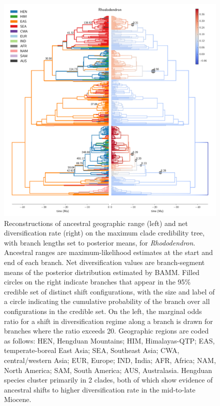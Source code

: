 \documentclass[12pt]{article}
\begin{document}
\begin{figure}
\begin{center}
\includegraphics[width=.99\textwidth]{figures/Rhododendron-supfig/Rhododendron-supfig.pdf}
\end{center}
\caption{Reconstructions of ancestral geographic range (left) and net diversification rate (right) on the maximum clade credibility tree, with branch lengths set to posterior means, for \textit{Rhododendron}. Ancestral ranges are maximum-likelihood estimates at the start and end of each branch. Net diversification values are branch-segment means of the posterior distribution estimated by BAMM. Filled circles on the right indicate branches that appear in the 95\% credible set of distinct shift configurations, with the size and label of a circle indicating the cumulative probability of the branch over all configurations in the credible set. On the left, the marginal odds ratio for a shift in diversification regime along a branch is drawn for branches where the ratio exceeds 20. Geographic regions are coded as follows: HEN, Hengduan Mountains; HIM, Himalayas-QTP; EAS, temperate-boreal East Asia; SEA, Southeast Asia; CWA, central/western Asia; EUR, Europe; IND, India; AFR, Africa; NAM, North America; SAM, South America; AUS, Australasia. Hengduan species cluster primarily in 2 clades, both of which show evidence of ancestral shifts to higher diversification rate in the mid-to-late Miocene.}
\label{fig:rhododendron}
\end{figure}
\end{document}

